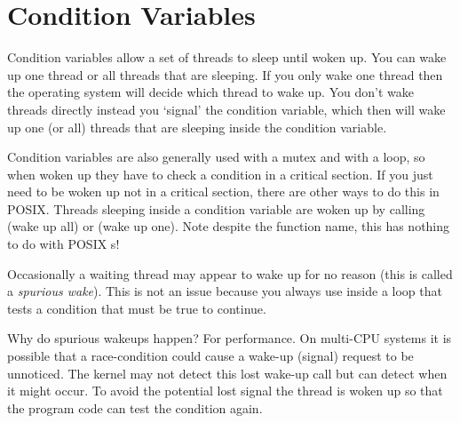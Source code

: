 \section{Condition Variables}

Condition variables allow a set of threads to sleep until woken up.
You can wake up one thread or all threads that are sleeping.
If you only wake one thread then the operating system will decide which thread to wake up.
You don't wake threads directly instead you `signal' the condition variable, which then will wake up one (or all) threads that are sleeping inside the condition variable.

Condition variables are also generally used with a mutex and with a loop, so when woken up they have to check a condition in a critical section.
If you just need to be woken up not in a critical section, there are other ways to do this in POSIX.
Threads sleeping inside a condition variable are woken up by calling  (wake up all) or  (wake up one).
Note despite the function name, this has nothing to do with POSIX s!

Occasionally a waiting thread may appear to wake up for no reason (this is called a \emph{spurious wake}).
This is not an issue because you always use  inside a loop that tests a condition that must be true to continue.

Why do spurious wakeups happen?
For performance. On multi-CPU systems it is possible that a race-condition could cause a wake-up (signal) request to be unnoticed.
The kernel may not detect this lost wake-up call but can detect when it might occur. To avoid the potential lost signal the thread is woken up so that the program code can test the condition again.

